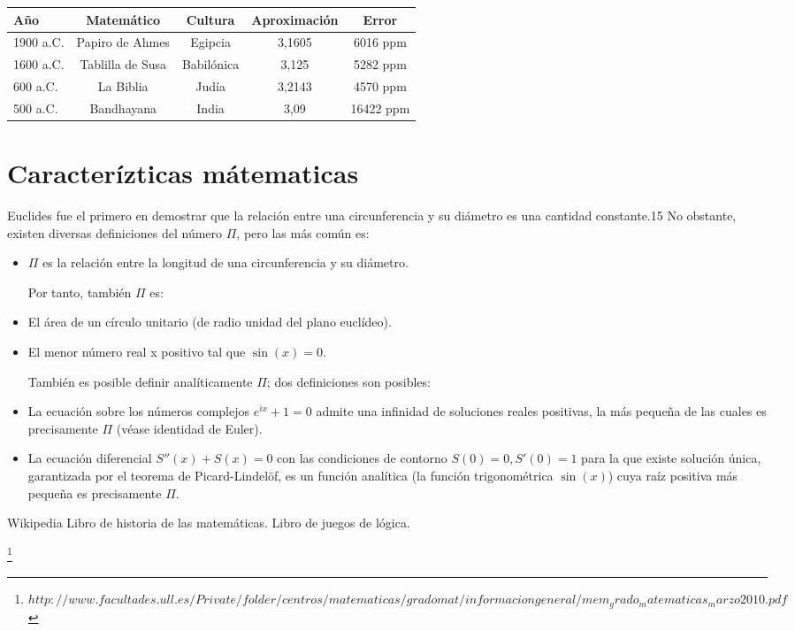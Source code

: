 \documentclass[spanish,11pt,a4paper]{article}
\begin{document}
\begin{tabular}{lcccc}
Año & Matemático & Cultura & Aproximación & Error\\
\hline
1900 a.C. & Papiro de Ahmes & Egipcia & 3,1605 & 6016 ppm\\
1600 a.C. & Tablilla de Susa & Babilónica & 3,125 & 5282 ppm\\
600 a.C. & La Biblia & Judía & 3,2143 & 4570 ppm\\
500 a.C. & Bandhayana & India & 3,09 & 16422 ppm

\end{tabular}

    
\section{Caracterízticas mátematicas}
Euclides fue el primero en demostrar que la relación entre una circunferencia y su diámetro es una cantidad constante.15 No obstante, existen diversas definiciones del número $\Pi$, pero las más común es:
\begin{itemize}

\item $\Pi$ es la relación entre la longitud de una circunferencia y su diámetro.

Por tanto, también $\Pi$ es:

\item El área de un círculo unitario (de radio unidad del plano euclídeo).
\item El menor número real x positivo tal que $\sin(x) = 0$.

También es posible definir analíticamente $\Pi$; dos definiciones son posibles:

\item La ecuación sobre los números complejos $e^{ix}+1=0$ admite una infinidad de soluciones reales positivas, la más pequeña de las cuales es precisamente $\Pi$ (véase identidad de Euler).
\item La ecuación diferencial $S''(x)+S(x)=0$ con las condiciones de contorno $S(0)=0, S'(0)=1$ para la que existe solución única, garantizada por el teorema de Picard-Lindelöf, es un función analítica (la función trigonométrica $\sin(x)$) cuya raíz positiva más pequeña es precisamente $\Pi$.
\end{itemize}



\begin{thebibliography}{3}
 Wikipedia
 Libro de historia de las matemáticas.
 Libro de juegos de lógica.
\end{thebibliography}

\footnote{$http://www.facultades.ull.es/Private/folder/centros
/matematicas/gradomat/informaciongeneral/mem_grado_
matematicas_marzo2010.pdf$}
\end{document}
